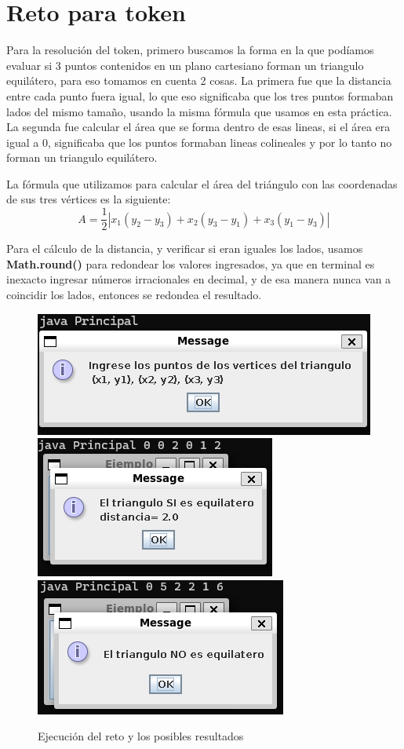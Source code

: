 \documentclass[letterpaper,12pt]{article}
\begin{document}
\printbibliography

\clearpage

\section{Reto para token}

Para la resolución del token, primero buscamos la forma en la que podíamos evaluar si 3 puntos contenidos en un plano cartesiano forman un triangulo equilátero, para eso tomamos en cuenta 2 cosas. La primera fue que la distancia entre cada punto fuera igual, lo que eso significaba que los tres puntos formaban lados del mismo tamaño, usando la misma fórmula que usamos en esta práctica. La segunda fue calcular el área que se forma dentro de esas lineas, si el área era igual a 0, significaba que los puntos formaban lineas colineales y por lo tanto no forman un triangulo equilátero.

La fórmula que utilizamos para calcular el área del triángulo con las coordenadas de sus tres vértices es la siguiente:
\[
A = \frac{1}{2} |x_1(y_2 - y_3) + x_2 (y_3 - y_1) + x_3 (y_1 - y_3)|
\]

Para el cálculo de la distancia, y verificar si eran iguales los lados, usamos \\\textbf{Math.round()} para redondear los valores ingresados, ya que en terminal es inexacto ingresar números irracionales en decimal, y de esa manera nunca van a coincidir los lados, entonces se redondea el resultado.

\begin{figure}[H]
 \centering
    \includegraphics[width=.8\textwidth]{Imagenes/reto1.png}
    \includegraphics[width=.8\textwidth]{Imagenes/reto2.png}
    \includegraphics[width=.8\textwidth]{Imagenes/reto3.png}
    \caption*{Ejecución del reto y los posibles resultados}
\end{figure}
\end{document}
